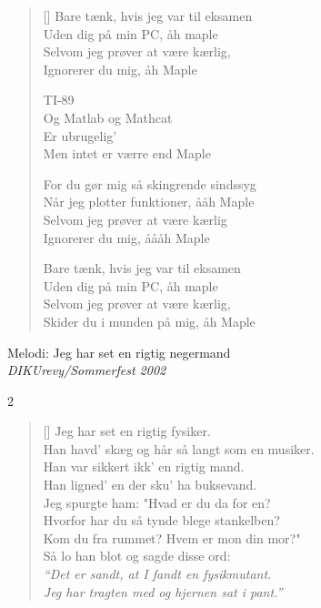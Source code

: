 {\begin{multicols}
\begin{verse}[\versewidth]
Bare tænk, hvis jeg var til eksamen\\
Uden dig på min PC, åh maple\\
Selvom jeg prøver at være kærlig,\\
Ignorerer du mig, åh Maple

TI-89\\
Og Matlab og Mathcat\\
Er ubrugelig'\\
Men intet er værre end Maple

For du gør mig så skingrende sindssyg\\
Når jeg plotter funktioner, ååh Maple\\
Selvom jeg prøver at være kærlig\\
Ignorerer du mig, åååh Maple

Bare tænk, hvis jeg var til eksamen\\
Uden dig på min PC, åh maple\\
Selvom jeg prøver at være kærlig,\\
Skider du i munden på mig, åh Maple
\end{verse}
\end{multicols}


\newpage




{Melodi: Jeg har set en rigtig negermand}\\[.2em]
{\small\itshape DIKUrevy/Sommerfest 2002}

\begin{multicols}2
\settowidth{\versewidth}{Han var knokleskæv og sikkert også kommunist}
\begin{verse}[\versewidth]
Jeg har set en rigtig fysiker.\\
Han havd’ skæg og hår så langt som en musiker.\\
Han var sikkert ikk’ en rigtig mand.\\
Han ligned’ en der sku’ ha buksevand.\\
Jeg spurgte ham: "Hvad er du da for en?\\
Hvorfor har du så tynde blege stankelben?\\
Kom du fra rummet? Hvem er mon din mor?"\\
Så lo han blot og sagde disse ord:\\
\emph{``Det er sandt, at I fandt en fysikmutant.\\
Jeg har tragten med og hjernen sat i pant.''}


\end{verse}
\end{multicols}}
